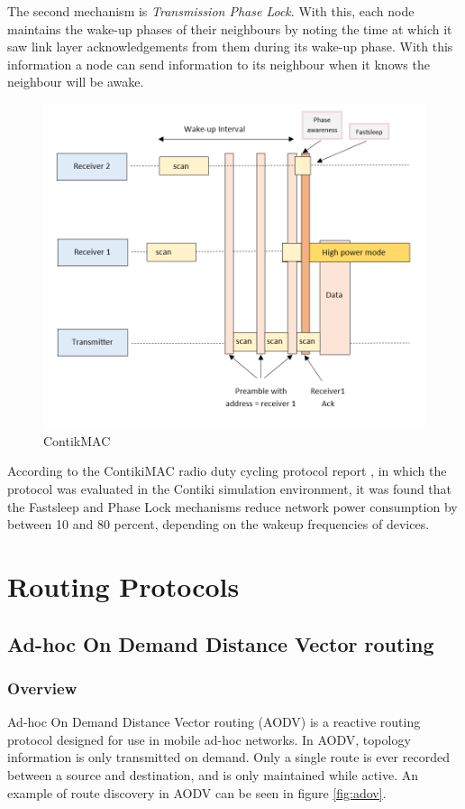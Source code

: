     The second mechanism is \textit{Transmission Phase Lock}. With this, each node maintains
    the wake-up phases of their neighbours by noting the time at which it saw link
    layer acknowledgements from them during its wake-up phase. With this information
    a node can send information to its neighbour when it knows the neighbour will be awake.

    \FloatBarrier
    \begin{figure}[ht]
      \includegraphics[width=\textwidth]{Images/chapter2/contikimac.png}
      \caption{ContikMAC}
      \label{fig:contikimac}
    \end{figure}
    \FloatBarrier

    According to the ContikiMAC radio duty cycling protocol report \cite{ContikiMAC},
    in which the protocol was evaluated in the Contiki simulation environment,
    it was found that the Fastsleep and Phase Lock mechanisms reduce network power
    consumption by between 10 and 80 percent, depending on the wakeup frequencies of
    devices.

    \section{Routing Protocols} \label{routing_protocols}
      \subsection{Ad-hoc On Demand Distance Vector routing}
        \subsubsection{Overview}
    Ad-hoc On Demand Distance Vector routing (AODV) \cite{RFC3561} is a reactive routing protocol
    designed for use in mobile ad-hoc networks. In AODV, topology information is only
    transmitted on demand. Only a single route is ever recorded between a source
    and destination, and is only maintained while active. An example of route discovery
    in AODV can be seen in figure \ref{fig:adov}.

